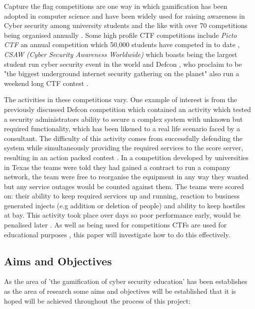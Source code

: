 \documentclass[12pt,a4paper]{article}
\begin{document}
Capture the flag competitions are one way in which gamification has been adopted in computer science and have been widely used for raising awareness in Cyber security among university students and the like \cite{ford2017capture} with over 70 competitions being organised annually \cite{katsantonis2017conceptual1}. Some high profile CTF competitions include \emph{Picto CTF} \cite{pictoctf} an annual competition which 50,000 students have competed in to date \cite{pictoctfstat}, \emph{CSAW (Cyber Security Awareness Worldwide)} which boasts being the largest student run cyber security event in the world \cite{csaw} and Defcon \cite{defcon}, who proclaim to be "the biggest underground internet security gathering on the planet" also run a weekend long CTF contest \cite{cowan2003defcon}.  


The activities in these competitions vary. One example of interest is from the previously discussed Defcon competition which contained an activity which tested a security administrators ability to secure a complex system with unknown but required functionality, which has been likened to a real life scenario faced by a consultant. The difficulty of this activity comes from successfully defending the system while simultaneously providing the required services to the score server, resulting in an action packed contest \cite{cowan2003defcon}. In a competition developed by universities in Texas the teams were told they had gained a contract to run a company network, the team were free to reorganise the equipment in any way they wanted but any service outages would be counted against them. The teams were scored on: their ability to keep  required services up and running, reaction to business generated injects (e.g addition or deletion of people) and ability to keep hostiles at bay. This activity took place over days so poor performance early, would be penalised later \cite{conklin2006cyber}. As well as being used for competitions CTFs are used for educational purposes \cite{noor2018usability}, this paper will investigate how to do this effectively.

\subsection{Aims and Objectives} 
As the area of 'the gamification of cyber security education' has been establishes as the area of research some aims and objectives will be established that it is hoped will be achieved throughout the process of this project:  
\end{document}
